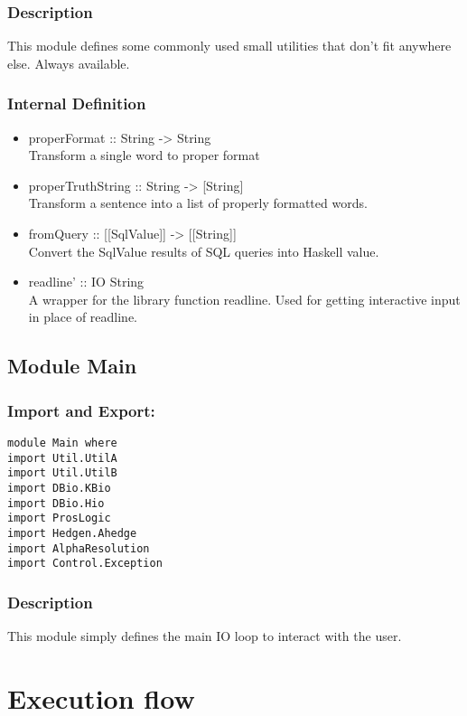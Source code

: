 \documentclass[../gr-final.tex]{subfiles}
\begin{document}
\subsubsection{Description}
This module defines some commonly used small utilities that don't
fit anywhere else. Always available.
\subsubsection{Internal Definition}
\begin{itemize}
\item properFormat :: String -> String\\
        Transform a single word to proper format
\item properTruthString :: String -> [String]\\
        Transform a sentence into a list of properly formatted
        words.
\item fromQuery :: [[SqlValue]] -> [[String]]\\
        Convert the SqlValue results of SQL queries into Haskell
        value.
\item readline' :: IO String\\
        A wrapper for the library function readline. Used
        for getting interactive input in place of readline.
\end{itemize}
\subsection{Module Main}
\subsubsection{Import and Export:}
\begin{lstlisting}
module Main where
import Util.UtilA
import Util.UtilB
import DBio.KBio
import DBio.Hio
import ProsLogic
import Hedgen.Ahedge
import AlphaResolution
import Control.Exception
\end{lstlisting}
\subsubsection{Description}
This module simply defines the main IO loop to interact with the
user.


\section{Execution flow}
\end{document}
